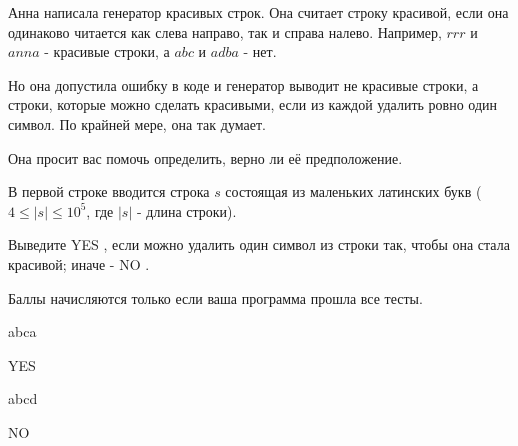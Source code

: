 
Анна написала генератор красивых строк. Она считает строку красивой, если она одинаково читается 
как слева направо, так и справа налево. Например, $rrr$ и $anna$ - красивые строки, а 
$abc$ и $adba$ - нет.

Но она допустила ошибку в коде и генератор выводит не красивые строки, а строки, которые можно 
сделать красивыми, если из каждой удалить ровно один символ. По крайней мере, она так думает.

Она просит вас помочь определить, верно ли её предположение.


В первой строке вводится строка $s$ состоящая из маленьких латинских букв \linebreak ($4 \le |s| \le 10^5$, где $|s|$ - длина строки).

\outputfmtSection

Выведите YES , если можно удалить один символ из строки так, чтобы она стала красивой; иначе - NO .

\markSection

Баллы начисляются только если ваша программа прошла все тесты.


\begin{myverbbox}[\small]{\vinput}
    abca
\end{myverbbox}
\begin{myverbbox}[\small]{\voutput}
    YES
\end{myverbbox}


\begin{myverbbox}[\small]{\vinput}
    abcd
\end{myverbbox}
\begin{myverbbox}[\small]{\voutput}
    NO
\end{myverbbox}

